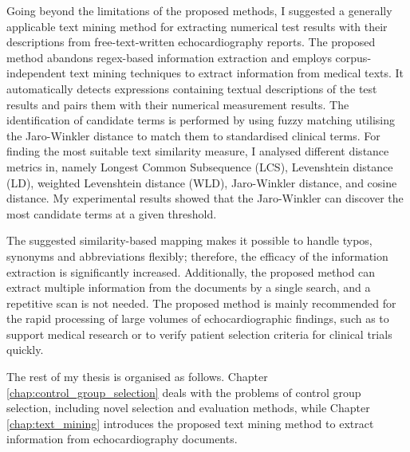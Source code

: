 Going beyond the limitations of the proposed methods, I suggested a generally applicable text mining method \cite{szeker2023general} for extracting numerical test results with their descriptions from free-text-written echocardiography reports. The proposed method abandons regex-based information extraction and employs corpus-independent text mining techniques to extract information from medical texts. It automatically detects expressions containing textual descriptions of the test results and pairs them with their numerical measurement results. The identification of candidate terms is performed by using fuzzy matching utilising the Jaro-Winkler distance to match them to standardised clinical terms. For finding the most suitable text similarity measure, I analysed different distance metrics in, namely Longest Common Subsequence (LCS), Levenshtein distance (LD), weighted Levenshtein distance (WLD), Jaro-Winkler distance, and cosine distance. My experimental results showed that the Jaro-Winkler can discover the most candidate terms at a given threshold.

The suggested similarity-based mapping makes it possible to handle typos, synonyms and abbreviations flexibly; therefore, the efficacy of the information extraction is significantly increased. Additionally, the proposed method can extract multiple information from the documents by a single search, and a repetitive scan is not needed. The proposed method is mainly recommended for the rapid processing of large volumes of echocardiographic findings, such as to support medical research or to verify patient selection criteria for clinical trials quickly.

\vspace{1.0cm}

The rest of my thesis is organised as follows. Chapter \ref{chap:control_group_selection} deals with the problems of control group selection, including novel selection and evaluation methods, while Chapter \ref{chap:text_mining} introduces the proposed text mining method to extract information from echocardiography documents.

